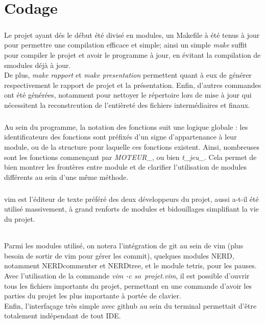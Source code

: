\documentclass{report}
\begin{document}
\chapter{Codage} %
    \paragraph*{} %
    Le projet ayant dés le début été divisé en modules, un Makefile à été tenus à jour pour permettre une compilation efficace et simple; ainsi un simple \textit{make} suffit pour 
    compiler le projet et avoir le programme à jour, en évitant la compilation de smodules déjà à jour. \\
    De plus, \textit{make rapport} et \textit{make presentation} permettent quant à eux de générer respectivement le rapport de projet et la présentation. 
    Enfin, d'autres commandes ont été générées, notamment pour nettoyer le répertoire lors de mise à jour qui nécessitent la reconstrcution de l'entièreté des 
        fichiers intermédiaires et finaux.
    \paragraph*{} %
    Au sein du programme, la notation des fonctions suit une logique globale : les identificateurs des fonctions sont préfixés d'un signe d'appartenance à leur module, ou de la structure
        pour laquelle ces fonctions existent. Ainsi, nombreuses sont les fonctions commençant par \textit{MOTEUR\_}, ou bien \textit{t\_jeu\_}. Cela permet de bien montrer les frontères
        entre module et de clarifier l'utilisation de modules différents au sein d'une même méthode.
    \paragraph*{} %

    \paragraph*{} %
    vim est l'éditeur de texte préféré des deux développeurs du projet, aussi a-t-il été utilisé massivement, à grand renforts de modules et bidouillages simplifiant la vie du projet.
        \subparagraph*{} %
        Parmi les modules utilisé, on notera l'intégration de git au sein de vim (plus besoin de sortir de vim pour gérer les commit), quelques modules NERD, notamment NERDcommenter et
        NERDtree, et le module tetris, pour les pauses. \\
        Avec l'utilisation de la commande \textit{vim -c so\ projet.vim}, il est possible d'ouvrir tous les fichiers importants du projet, permettant en une commande d'avoir les 
            parties du projet les plus importante à portée de clavier.\\
        Enfin, l'interfaçage très simple avec github au sein du terminal permettait d'être totalement indépendant de tout IDE.
\end{document}
